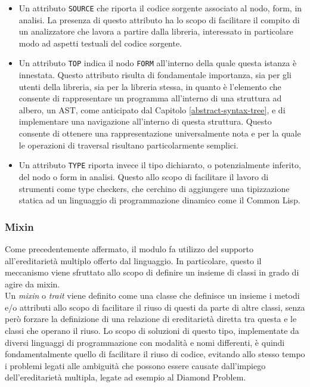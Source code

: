 \begin{itemize}

\item Un attributo \texttt{SOURCE} che riporta il codice sorgente associato al
nodo, form, in analisi. La presenza di questo attributo ha lo scopo di
facilitare il compito di un analizzatore che lavora a partire dalla libreria,
interessato in particolare modo ad aspetti testuali del codice sorgente.

\item Un attributo \texttt{TOP} indica il nodo \texttt{FORM} all’interno della
quale questa istanza è innestata. Questo attributo risulta di fondamentale
importanza, sia per gli utenti della libreria, sia per la libreria stessa, in
quanto è l'elemento che consente di rappresentare un programma all’interno di
una struttura ad albero, un AST, come anticipato dal Capitolo
\ref{abstract-syntax-tree}, e di implementare una navigazione all'interno di
questa struttura. Questo consente di ottenere una rappresentazione
universalmente nota e per la quale le operazioni di traversal risultano
particolarmente semplici.

\item Un attributo \texttt{TYPE} riporta invece il tipo dichiarato, o
potenzialmente inferito, del nodo o form in analisi. Questo allo scopo di
facilitare il lavoro di strumenti come type checkers, che cerchino di aggiungere
una tipizzazione statica ad un linguaggio di programmazione dinamico come il
Common Lisp.

\end{itemize}

\subsubsection{Mixin}

Come precedentemente affermato, il modulo fa utilizzo del supporto
all'ereditarietà multiplo offerto dal linguaggio. In particolare, questo il
meccanismo viene sfruttato allo scopo di definire un insieme di classi in grado
di agire da mixin.\\

Un \textit{mixin} o \textit{trait} viene definito come una classe che definisce
un insieme i metodi e/o attributi allo scopo di facilitare il riuso di questi da
parte di altre classi, senza però forzare la definizione di una relazione di
ereditarietà diretta tra questa e le classi che operano il riuso. Lo scopo di
soluzioni di questo tipo, implementate da diversi linguaggi di programmazione
con modalità e nomi differenti, è quindi fondamentalmente quello di facilitare
il riuso di codice, evitando allo stesso tempo i problemi legati alle ambiguità
che possono essere causate dall’impiego dell’ereditarietà multipla, legate ad
esempio al Diamond Problem\cite{martin1997}.\\

